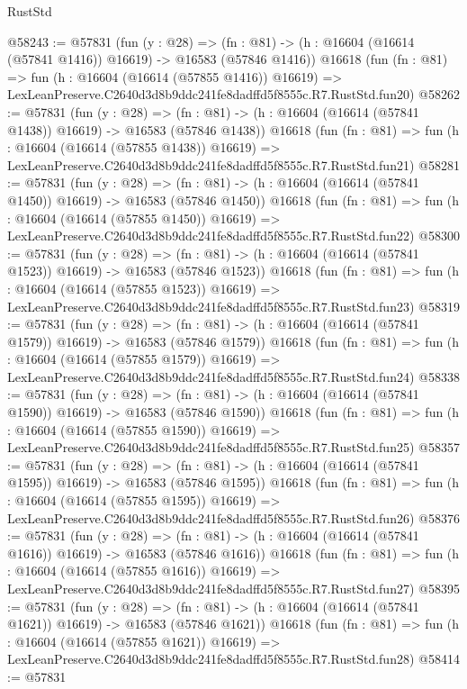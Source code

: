 \begin{lexlean}{RustStd}
\begin{coremodule}
@58243 := @57831
    (fun (y : @28) =>
    (fn : @81) -> (h : @16604 (@16614 (@57841 @1416)) @16619) -> @16583 (@57846 @1416))
    @16618
    (fun (fn : @81) =>
    fun (h : @16604 (@16614 (@57855 @1416)) @16619) =>
    LexLeanPreserve.C2640d3d8b9ddc241fe8dadffd5f8555c.R7.RustStd.fun20)
@58262 := @57831
    (fun (y : @28) =>
    (fn : @81) -> (h : @16604 (@16614 (@57841 @1438)) @16619) -> @16583 (@57846 @1438))
    @16618
    (fun (fn : @81) =>
    fun (h : @16604 (@16614 (@57855 @1438)) @16619) =>
    LexLeanPreserve.C2640d3d8b9ddc241fe8dadffd5f8555c.R7.RustStd.fun21)
@58281 := @57831
    (fun (y : @28) =>
    (fn : @81) -> (h : @16604 (@16614 (@57841 @1450)) @16619) -> @16583 (@57846 @1450))
    @16618
    (fun (fn : @81) =>
    fun (h : @16604 (@16614 (@57855 @1450)) @16619) =>
    LexLeanPreserve.C2640d3d8b9ddc241fe8dadffd5f8555c.R7.RustStd.fun22)
@58300 := @57831
    (fun (y : @28) =>
    (fn : @81) -> (h : @16604 (@16614 (@57841 @1523)) @16619) -> @16583 (@57846 @1523))
    @16618
    (fun (fn : @81) =>
    fun (h : @16604 (@16614 (@57855 @1523)) @16619) =>
    LexLeanPreserve.C2640d3d8b9ddc241fe8dadffd5f8555c.R7.RustStd.fun23)
@58319 := @57831
    (fun (y : @28) =>
    (fn : @81) -> (h : @16604 (@16614 (@57841 @1579)) @16619) -> @16583 (@57846 @1579))
    @16618
    (fun (fn : @81) =>
    fun (h : @16604 (@16614 (@57855 @1579)) @16619) =>
    LexLeanPreserve.C2640d3d8b9ddc241fe8dadffd5f8555c.R7.RustStd.fun24)
@58338 := @57831
    (fun (y : @28) =>
    (fn : @81) -> (h : @16604 (@16614 (@57841 @1590)) @16619) -> @16583 (@57846 @1590))
    @16618
    (fun (fn : @81) =>
    fun (h : @16604 (@16614 (@57855 @1590)) @16619) =>
    LexLeanPreserve.C2640d3d8b9ddc241fe8dadffd5f8555c.R7.RustStd.fun25)
@58357 := @57831
    (fun (y : @28) =>
    (fn : @81) -> (h : @16604 (@16614 (@57841 @1595)) @16619) -> @16583 (@57846 @1595))
    @16618
    (fun (fn : @81) =>
    fun (h : @16604 (@16614 (@57855 @1595)) @16619) =>
    LexLeanPreserve.C2640d3d8b9ddc241fe8dadffd5f8555c.R7.RustStd.fun26)
@58376 := @57831
    (fun (y : @28) =>
    (fn : @81) -> (h : @16604 (@16614 (@57841 @1616)) @16619) -> @16583 (@57846 @1616))
    @16618
    (fun (fn : @81) =>
    fun (h : @16604 (@16614 (@57855 @1616)) @16619) =>
    LexLeanPreserve.C2640d3d8b9ddc241fe8dadffd5f8555c.R7.RustStd.fun27)
@58395 := @57831
    (fun (y : @28) =>
    (fn : @81) -> (h : @16604 (@16614 (@57841 @1621)) @16619) -> @16583 (@57846 @1621))
    @16618
    (fun (fn : @81) =>
    fun (h : @16604 (@16614 (@57855 @1621)) @16619) =>
    LexLeanPreserve.C2640d3d8b9ddc241fe8dadffd5f8555c.R7.RustStd.fun28)
@58414 := @57831

\end{coremodule}
\end{lexlean}

